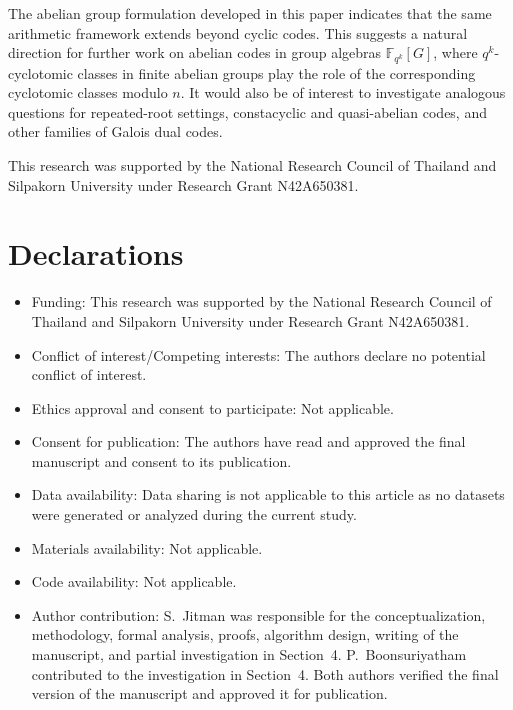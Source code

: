 \documentclass[pdflatex,sn-mathphys-num]{sn-jnl}%
\theoremstyle{thmstyleone}%
\theoremstyle{thmstyletwo}%
\theoremstyle{thmstylethree}%
\newcommand{\F}{\mathbb{F}}
\begin{document}
The abelian group formulation developed in this paper indicates that the same arithmetic framework extends beyond cyclic codes. This suggests a natural direction for further work on  abelian codes in group algebras $\F_{q^k}[G]$, where $q^k$-cyclotomic classes in finite abelian groups play the role of the corresponding cyclotomic classes modulo $n$. It would also be of interest to investigate analogous questions for repeated-root settings, constacyclic and quasi-abelian codes, and other families of Galois dual codes.




This research was supported by the National Research Council of Thailand and Silpakorn University under Research Grant N42A650381.
 

\section*{Declarations}

 

\begin{itemize}
\item Funding:  This research was supported by the National Research Council of Thailand and Silpakorn University under Research Grant N42A650381.
\item Conflict of interest/Competing interests:  The authors declare no potential conflict of interest. 
\item Ethics approval and consent to participate: Not applicable.
\item Consent for publication: The  authors have read and approved the final manuscript and consent to its publication.
\item Data availability: Data sharing is not applicable to this article as no datasets were generated or analyzed during the current study.
\item Materials availability:  Not applicable.
\item Code availability:  Not applicable.
\item Author contribution:  S.~Jitman was responsible for the conceptualization, methodology, formal analysis, proofs, algorithm design, writing of the manuscript, and partial investigation in Section~4. P.~Boonsuriyatham contributed to the investigation in Section~4. Both authors verified the final version of the manuscript and approved it for publication.
 
\end{itemize}
\end{document}
